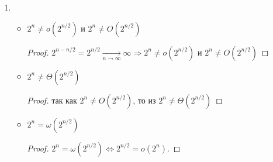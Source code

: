 \begin{enumerate}
\begin{proof}
        Рассмотрим еще $\sqrt{n} \neq \omega(n^{\sin n})$: по определению
        \begin{equation}
            \forall C>0\,\,\exists N:\forall n > N \,\, Cn^{\sin n} < \sqrt{n}
        \end{equation}
        Как ранее уже говорилось, $n^{\sin n}$ ограничена сверху $n$, а, точнее, всегда имеются значения, сколько угодно близкие к $n$, при этом $ \frac{n}{\sqrt{n}} \xrightarrow[n\to\infty]{} \infty $, следовательно, нет таких $C$, чтобы выполнялось $Cn^{\sin n} < \sqrt{n} \quad \forall n>N$, таким образом, $\sqrt{n} \neq \omega(n^{\sin n})$. Аналогично, $\sqrt{n} \neq \Omega(n^{\sin n})$
    \end{proof}
    \item 
    \begin{itemize}
        \item $2^{n} \neq o(2^{n/2})$ и $2^{n} \neq O(2^{n/2})$ 
        \begin{proof}
            $2^{n - n/2} = 2^{n/2} \xrightarrow[n\to\infty]{} \infty \Longrightarrow 2^n\neq o(2^{n/2})$ и $2^n\neq O(2^{n/2})$
        \end{proof}
        \item $2^n \neq \Theta(2^{n/2})$
        \begin{proof}
            так как $2^n\neq O(2^{n/2})$, то из $2^n\neq\Theta(2^{n/2})$
        \end{proof}
        \item $2^n=\omega(2^{n/2})$
        \begin{proof}
            $2^n=\omega(2^{n/2}) \Leftrightarrow 2^{n/2}=o(2^n)$.
            

\end{proof}
\end{itemize}
\end{enumerate}
